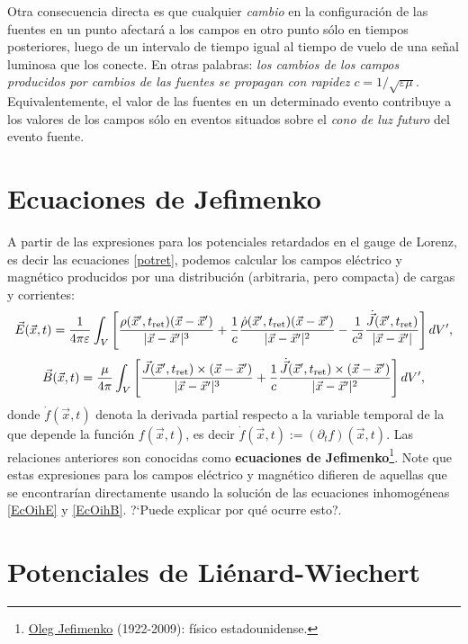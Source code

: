 Otra consecuencia directa es que cualquier \textit{cambio} en la configuración de las fuentes en un punto afectará a los campos en otro punto sólo en tiempos posteriores, luego de un intervalo de tiempo igual al tiempo de vuelo de una señal luminosa que los conecte. En otras palabras: \textit{los cambios de los campos producidos por cambios de las fuentes se propagan con rapidez $c=1/\sqrt{\varepsilon\mu}$}. Equivalentemente, el valor de las fuentes en un determinado evento contribuye a los valores de los campos sólo en eventos situados sobre el \textit{cono de luz futuro} del evento fuente.


\section{Ecuaciones de Jefimenko}
A partir de las expresiones para los potenciales retardados en el gauge de Lorenz, es decir las ecuaciones \eqref{potret}, podemos calcular los campos eléctrico y magnético producidos por una distribución (arbitraria, pero compacta) de cargas y corrientes:
\begin{equation}
\vec{E}(\vec{x},t)=\frac{1}{4\pi\varepsilon}\int_V \left[  \frac{\rho(\vec{x}',t_{\rm ret})(\vec{x}-\vec{x}')}{\vert \vec{x}-\vec{x}' \vert^3} + \frac{1}{c}\frac{ \dot\rho(\vec{x}',t_{\rm ret})(\vec{x}-\vec{x}')}{\vert\vec{x}-\vec{x}'\vert^2} -\frac{1}{c^2}\frac{\dot{\vec{J}} (\vec{x}',t_{\rm ret})}{\vert\vec{x}-\vec{x}' \vert} \right] dV',
\end{equation}
\begin{equation}
\vec{B}(\vec{x},t)=\frac{\mu}{4\pi} \int_V\left[
\frac{\vec{J}(\vec{x}',t_{\rm ret})\times(\vec{x}-\vec{x}')}{\vert \vec{x}-\vec{x}'\vert^3}+ \frac{1}{c}\frac{ \dot{\vec{J}}(\vec{x}',t_{\rm ret})\times(\vec{x}-\vec{x}')}{\vert\vec{x}-\vec{x}' \vert^2} \right]dV', \label{b3}
\end{equation}
donde $\dot{f}(\vec{x},t)$ denota la derivada partial respecto a la variable temporal de la que depende la función $f(\vec{x},t)$, es decir $\dot{f}(\vec{x},t):=(\partial_t f)(\vec{x},t)$. Las relaciones anteriores son conocidas como \textbf{ecuaciones de Jefimenko}\footnote{\href{http://en.wikipedia.org/wiki/Jefimenko}{Oleg Jefimenko} (1922-2009): físico estadounidense.}. Note que estas expresiones para los campos eléctrico y magnético difieren de aquellas que se encontrarían directamente usando la solución de las ecuaciones inhomogéneas \eqref{EcOihE} y \eqref{EcOihB}. ?`Puede explicar por qué ocurre esto?.


\section{Potenciales de Liénard-Wiechert}

